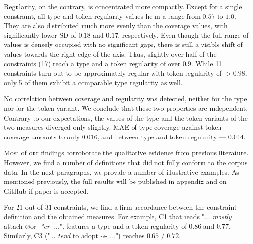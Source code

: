 \documentclass[10pt, a4paper]{article}
\newcommand{\zeroLinker}{\ensuremath{\boldsymbol{\varnothing}}}
\begin{document}
Regularity, on the contrary, is concentrated more compactly. Except for a single constraint, all type and token regularity values lie in a range from $0.57$ to $1.0$. They are also distributed much more evenly than the coverage values, with significantly lower SD of $0.18$ and $0.17$, respectively. Even though the full range of values is densely occupied with no significant gaps, there is still a visible shift of values towards the right edge of the axis. Thus, slightly over half of the constraints (17) reach a type and a token regularity of over $0.9$. While 11 constraints turn out to be approximately regular with token regularity of $>0.98$, only 5 of them exhibit a comparable type regularity as well.

No correlation between coverage and regularity was detected, neither for the type nor for the token variant. We conclude that these two properties are independent. Contrary to our expectations, the values of the type and the token variants of the two measures diverged only slightly. MAE of type coverage against token coverage amounts to only $0.016$, and between type and token regularity --- $0.044$.


Most of our findings corroborate the qualitative evidence from previous literature. However, we find a number of definitions that did not fully conform to the corpus data. In the next paragraphs, we provide a number of illustrative examples. As mentioned previously, the full results will be published in appendix and on GitHub if paper is accepted.

For 21 out of 31 constraints, we find a firm accordance between the constraint definition and the obtained measures. For example, C1 that reads  "... \textit{mostly} attach \zeroLinker or -\textit{"er}- ...", features a type and a token regularity of $0.86$ and $0.77$. Similarly, C3 ("... \textit{tend} to adopt -\textit{s}- ...") reaches $0.65$ / $0.72$.
\end{document}
